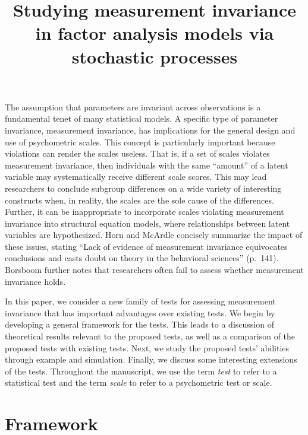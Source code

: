 \documentclass[man]{apa}
\title{Studying measurement invariance in factor analysis models
  via stochastic processes}
\begin{document}
\maketitle

The assumption that parameters are
invariant across observations is a
fundamental tenet of many statistical models.  A specific type of 
parameter invariance, measurement invariance, has implications for the
general design and use of psychometric scales.
This concept is 
particularly important because violations can render the scales
useless.  
That is, if a set of scales violates measurement invariance,
then individuals with the same ``amount'' of a latent variable 
may systematically receive 
different scale scores.
This may lead researchers to conclude subgroup
differences on a wide variety of interesting constructs 
when, in reality, the scales are the sole cause of the 
differences.  Further, it can be inappropriate to incorporate scales
violating measurement invariance into structural equation
models, where relationships between latent variables are hypothesized.  Horn
and McArdle \citeyear{HorMca92} concisely summarize the impact of
these issues, stating ``Lack of evidence of measurement 
invariance equivocates conclusions and casts doubt on theory in the
behavioral sciences'' (p.~141).  Borsboom \citeyear{Bor06a} further 
notes that researchers often fail to assess whether measurement
invariance holds.

In this paper, we consider a new family of tests for assessing
measurement invariance that has important advantages over existing
tests.  We begin by developing a general framework for the tests.
This leads to a discussion of theoretical results relevant to the
proposed tests, as well as a comparison of the proposed tests with
existing tests.  Next,
we study the 
proposed tests' abilities through example and simulation.  Finally,
we discuss some interesting extensions of the tests.
Throughout the manuscript, we use the term {\em{test}} to refer to a
statistical test and the term {\em{scale}} to refer to a psychometric 
test or scale.

\section{Framework}
\end{document}
